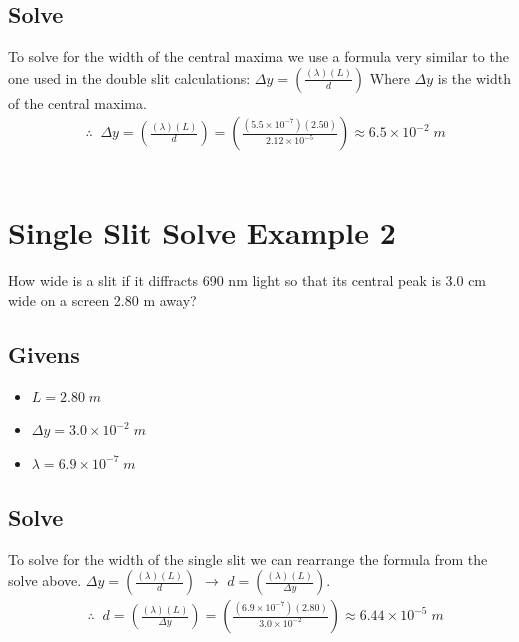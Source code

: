 \documentclass{article}
\begin{document}
\subsection*{Solve}
To solve for the width of the central maxima we use a formula very similar to the one used in the double slit calculations: $\Delta y = \left(\frac{(\lambda)(L)}{d}\right)$ Where $\Delta y$ is the width of the central maxima.\\
\begin{align*}
     & \therefore\;\;\Delta y = \left(\frac{(\lambda)(L)}{d}\right) = \left(\frac{(5.5 \times 10^{-7})(2.50)}{2.12 \times 10^{-5}}\right) \approx 6.5 \times 10^{-2}\;m
\end{align*}\leavevmode\\

\section{Single Slit Solve Example 2}
How wide is a slit if it diffracts 690 nm light so that its central peak is 3.0 cm wide on a screen 2.80 m away?
\subsection*{Givens}
\begin{itemize}
    \item $L = 2.80\;m$
    \item $ \Delta y = 3.0 \times 10^{-2}\;m$
    \item $\lambda = 6.9 \times 10^{-7}\;m$
\end{itemize}\leavevmode
\subsection*{Solve}
To solve for the width of the single slit we can rearrange the formula from the solve above. $\Delta y = \left(\frac{(\lambda)(L)}{d}\right)$ $\to$ $d = \left(\frac{(\lambda)(L)}{\Delta y}\right)$.\\
\begin{align*}
     & \therefore\;\;d = \left(\frac{(\lambda)(L)}{\Delta y}\right) = \left(\frac{(6.9 \times 10^{-7})(2.80)}{3.0 \times 10^{-2}}\right) \approx 6.44 \times 10^{-5}\;m
\end{align*}\leavevmode\\
\end{document}
